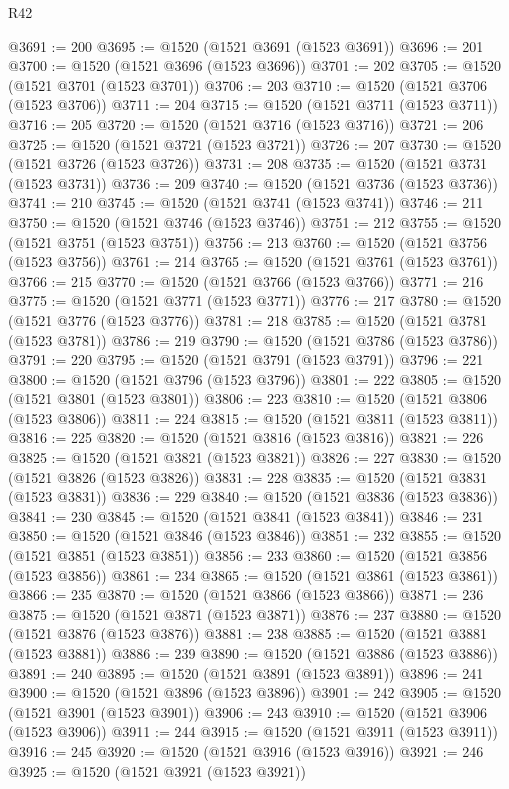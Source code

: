 \begin{lexlean}{R42}
\begin{coremodule}
{@3691 := 200
@3695 := @1520 (@1521 @3691 (@1523 @3691))
@3696 := 201
@3700 := @1520 (@1521 @3696 (@1523 @3696))
@3701 := 202
@3705 := @1520 (@1521 @3701 (@1523 @3701))
@3706 := 203
@3710 := @1520 (@1521 @3706 (@1523 @3706))
@3711 := 204
@3715 := @1520 (@1521 @3711 (@1523 @3711))
@3716 := 205
@3720 := @1520 (@1521 @3716 (@1523 @3716))
@3721 := 206
@3725 := @1520 (@1521 @3721 (@1523 @3721))
@3726 := 207
@3730 := @1520 (@1521 @3726 (@1523 @3726))
@3731 := 208
@3735 := @1520 (@1521 @3731 (@1523 @3731))
@3736 := 209
@3740 := @1520 (@1521 @3736 (@1523 @3736))
@3741 := 210
@3745 := @1520 (@1521 @3741 (@1523 @3741))
@3746 := 211
@3750 := @1520 (@1521 @3746 (@1523 @3746))
@3751 := 212
@3755 := @1520 (@1521 @3751 (@1523 @3751))
@3756 := 213
@3760 := @1520 (@1521 @3756 (@1523 @3756))
@3761 := 214
@3765 := @1520 (@1521 @3761 (@1523 @3761))
@3766 := 215
@3770 := @1520 (@1521 @3766 (@1523 @3766))
@3771 := 216
@3775 := @1520 (@1521 @3771 (@1523 @3771))
@3776 := 217
@3780 := @1520 (@1521 @3776 (@1523 @3776))
@3781 := 218
@3785 := @1520 (@1521 @3781 (@1523 @3781))
@3786 := 219
@3790 := @1520 (@1521 @3786 (@1523 @3786))
@3791 := 220
@3795 := @1520 (@1521 @3791 (@1523 @3791))
@3796 := 221
@3800 := @1520 (@1521 @3796 (@1523 @3796))
@3801 := 222
@3805 := @1520 (@1521 @3801 (@1523 @3801))
@3806 := 223
@3810 := @1520 (@1521 @3806 (@1523 @3806))
@3811 := 224
@3815 := @1520 (@1521 @3811 (@1523 @3811))
@3816 := 225
@3820 := @1520 (@1521 @3816 (@1523 @3816))
@3821 := 226
@3825 := @1520 (@1521 @3821 (@1523 @3821))
@3826 := 227
@3830 := @1520 (@1521 @3826 (@1523 @3826))
@3831 := 228
@3835 := @1520 (@1521 @3831 (@1523 @3831))
@3836 := 229
@3840 := @1520 (@1521 @3836 (@1523 @3836))
@3841 := 230
@3845 := @1520 (@1521 @3841 (@1523 @3841))
@3846 := 231
@3850 := @1520 (@1521 @3846 (@1523 @3846))
@3851 := 232
@3855 := @1520 (@1521 @3851 (@1523 @3851))
@3856 := 233
@3860 := @1520 (@1521 @3856 (@1523 @3856))
@3861 := 234
@3865 := @1520 (@1521 @3861 (@1523 @3861))
@3866 := 235
@3870 := @1520 (@1521 @3866 (@1523 @3866))
@3871 := 236
@3875 := @1520 (@1521 @3871 (@1523 @3871))
@3876 := 237
@3880 := @1520 (@1521 @3876 (@1523 @3876))
@3881 := 238
@3885 := @1520 (@1521 @3881 (@1523 @3881))
@3886 := 239
@3890 := @1520 (@1521 @3886 (@1523 @3886))
@3891 := 240
@3895 := @1520 (@1521 @3891 (@1523 @3891))
@3896 := 241
@3900 := @1520 (@1521 @3896 (@1523 @3896))
@3901 := 242
@3905 := @1520 (@1521 @3901 (@1523 @3901))
@3906 := 243
@3910 := @1520 (@1521 @3906 (@1523 @3906))
@3911 := 244
@3915 := @1520 (@1521 @3911 (@1523 @3911))
@3916 := 245
@3920 := @1520 (@1521 @3916 (@1523 @3916))
@3921 := 246
@3925 := @1520 (@1521 @3921 (@1523 @3921))
}
\end{coremodule}
\end{lexlean}

